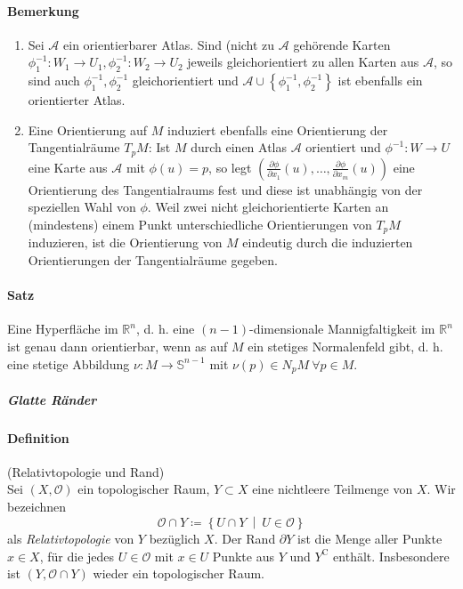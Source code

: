 \documentclass[12pt,a4paper,fleqn]{article}
\def\set#1{{\left\{ #1 \right\}}}
\def\Mid{\ \middle|\ }
\def\R{{\mathbb{R}}}
\begin{document}
\paragraph{Bemerkung}
\begin{enumerate}
\item Sei $\mathcal{A}$ ein orientierbarer Atlas. Sind (nicht zu $\mathcal{A}$ gehörende Karten $\phi^{-1}_1\colon W_1 \rightarrow U_1, \phi^{-1}_2\colon W_2 \rightarrow U_2$ jeweils gleichorientiert zu allen Karten aus $\mathcal{A}$, so sind auch $\phi_1^{-1}, \phi_2^{-1}$ gleichorientiert und $\mathcal{A} \cup \set{\phi_1^{-1}, \phi_2^{-1}}$ ist ebenfalls ein orientierter Atlas.
\item Eine Orientierung auf $M$ induziert ebenfalls eine Orientierung der Tangentialräume $T_p M$: Ist $M$ durch einen Atlas $\mathcal{A}$ orientiert und $\phi^{-1}\colon W \rightarrow U$ eine Karte aus $\mathcal{A}$ mit $\phi(u) = p$, so legt ${(\frac{\partial \phi}{\partial x_1}(u), \dots, \frac{\partial \phi}{\partial x_m}(u))}$ eine Orientierung des Tangentialraums fest und diese ist unabhängig von der speziellen Wahl von $\phi$. Weil zwei nicht gleichorientierte Karten an (mindestens) einem Punkt unterschiedliche Orientierungen von $T_p M$ induzieren, ist die Orientierung von $M$ eindeutig durch die induzierten Orientierungen der Tangentialräume gegeben.
\end{enumerate}

\paragraph{Satz} Eine Hyperfläche im $\R^n$, d. h. eine $(n - 1)$-dimensionale Mannigfaltigkeit im $\R^n$ ist genau dann orientierbar, wenn as auf $M$ ein stetiges Normalenfeld gibt, d. h. eine stetige Abbildung $\nu\colon M \rightarrow \mathbb{S}^{n-1}$ mit $\nu(p) \in N_p M\ \forall p \in M$.

\subparagraph{Glatte Ränder}
\paragraph{Definition} (Relativtopologie und Rand)\\
Sei $(X, \mathcal{O})$ ein topologischer Raum, $Y \subset X$ eine nichtleere Teilmenge von $X$. Wir bezeichnen
\begin{displaymath}
\mathcal{O} \cap Y \coloneqq \set{U\cap Y \Mid U \in \mathcal{O}}
\end{displaymath}
als \textit{Relativtopologie} von $Y$ bezüglich $X$.
Der Rand $\partial Y$ ist die Menge aller Punkte $x \in X$, für die jedes $U \in \mathcal{O}$ mit $x \in U$ Punkte aus $Y$ und $Y^\mathrm{C}$ enthält. Insbesondere ist $(Y, \mathcal{O} \cap Y)$ wieder ein topologischer Raum. 
\end{document}
